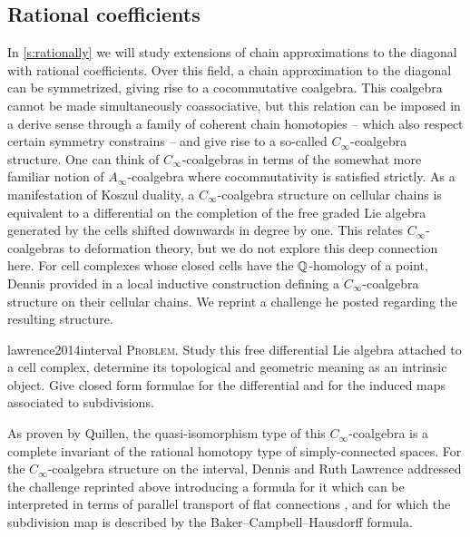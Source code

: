 \subsection*{Rational coefficients}

In \cref{s:rationally} we will study extensions of chain approximations to the diagonal with rational coefficients.
Over this field, a chain approximation to the diagonal can be symmetrized, giving rise to a cocommutative coalgebra.
This coalgebra cannot be made simultaneously coassociative, but this relation can be imposed in a derive sense through a family of coherent chain homotopies -- which also respect certain symmetry constrains -- and give rise to a so-called $C_\infty$-coalgebra structure.
One can think of $C_\infty$-coalgebras in terms of the somewhat more familiar notion of $A_\infty$-coalgebra where cocommutativity is satisfied strictly.
As a manifestation of Koszul duality, a $C_\infty$-coalgebra structure on cellular chains is equivalent to a differential on the completion of the free graded Lie algebra generated by the cells shifted downwards in degree by one.
This relates $C_\infty$-coalgebras to deformation theory, but we do not explore this deep connection here.
For cell complexes whose closed cells have the $\mathbb{Q}$-homology of a point, Dennis provided in \cite{sullivan2007appendix} a local inductive construction defining a $C_\infty$-coalgebra structure on their cellular chains.
We reprint a challenge he posted regarding the resulting structure.
\begin{displaycquote}[p.2]{lawrence2014interval}
	\textsc{Problem}. Study this free differential Lie algebra attached to a cell complex, determine its topological and geometric meaning as an intrinsic object.
	Give closed form formulae for the differential and for the induced maps associated to subdivisions.
\end{displaycquote}
As proven by Quillen, the quasi-isomorphism type of this $C_\infty$-coalgebra is a complete invariant of the rational homotopy type of simply-connected spaces.
For the $C_\infty$-coalgebra structure on the interval, Dennis and Ruth Lawrence addressed the challenge reprinted above introducing a formula for it which can be interpreted in terms of parallel transport of flat connections \cite{lawrence2014interval}, and for which the subdivision map is described by the Baker--Campbell--Hausdorff formula.

